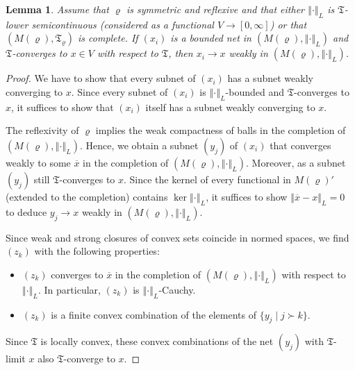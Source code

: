 \documentclass[a4paper,11pt,reqno]{amsart}
\newtheorem{lemma}{Lemma}[section]
\theoremstyle{definition}
\numberwithin{equation}{section}
\newcommand{\vr}{{\varrho}}
\newcommand{\av}[1]{\left\Vert #1\right\Vert}
\newcommand{\1}{\mathds{1}}
\begin{document}
\begin{lemma}\label{lemma:weak convergence} 
 Assume that $\vr$ is  symmetric and reflexive and that either $\av{\cdot}_L$ is  $\mathfrak{T}$-lower semicontinuous (considered as a functional $V \to [0,\infty]$) or that $(M(\vr),\mathfrak{T}_\vr)$ is complete. If $(x_i)$ is a bounded net in $(M(\vr),\av{\cdot}_L)$ and $\mathfrak{T}$-converges to $x \in V$ with respect to $\mathfrak{T}$, then $x_i \to x$ weakly in $(M(\vr),\av{\cdot}_L)$. 
\end{lemma}
\begin{proof}
We have to show that every subnet of $(x_i)$ has a subnet weakly converging to $x$. Since every subnet of $(x_i)$ is $\av{\cdot}_L$-bounded and $\mathfrak{T}$-converges to $x$, it suffices to show that $(x_i)$ itself has a subnet weakly converging to $x$. 



% 
% 
% 
% 

The reflexivity of $\vr$ implies the weak compactness of balls in the completion of $(M(\vr),\av{\cdot}_L)$. Hence, we obtain a subnet $(y_j)$ of $(x_i)$ that converges weakly to some $\overline x$ in the completion of $(M(\vr),\av{\cdot}_L)$. Moreover, as a subnet $(y_j)$ still $\mathfrak{T}$-converges to $x$. Since the kernel of every functional in $M(\vr)'$ (extended to the completion) contains $\ker \av{\cdot}_L$, it suffices to show $\av{\overline x - x}_L = 0$ to deduce $y_j \to x$ weakly in $(M(\vr),\av{\cdot}_L)$. 

Since weak and strong closures of convex sets coincide in normed spaces, we find $(z_k)$ with the following properties:
 \begin{itemize}
  \item $(z_k)$  converges to $\overline{x}$ in the completion of $(M(\vr),\av{\cdot}_L)$ with respect to $\av{\cdot}_L$. In particular, $(z_k)$ is $\av{\cdot}_L$-Cauchy. 
  \item $(z_k)$ is a finite convex combination of the elements of $\{y_{j} \mid j \succ k\}$.
  \end{itemize}
  Since $\mathfrak{T}$ is locally convex, these convex combinations of the net $(y_j)$ with $\mathfrak{T}$-limit $x$ also $\mathfrak{T}$-converge to $x$.
  

\end{proof}
\end{document}
